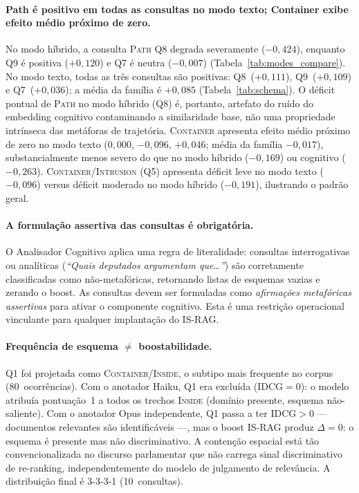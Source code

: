 \documentclass[11pt,a4paper]{article}
\begin{document}
\paragraph{Path é positivo em todas as consultas no modo texto; Container exibe efeito médio próximo de zero.}
No modo híbrido, a consulta \textsc{Path} Q8 degrada severamente
($-0{,}424$), enquanto Q9 é positiva ($+0{,}120$) e Q7 é neutra
($-0{,}007$) (Tabela~\ref{tab:modes_compare}).
No modo texto, todas as três consultas são positivas:
Q8~($+0{,}111$), Q9~($+0{,}109$) e Q7~($+0{,}036$);
a média da família é $+0{,}085$ (Tabela~\ref{tab:schema}).
O déficit pontual de \textsc{Path} no modo híbrido (Q8) é, portanto,
artefato do ruído do embedding cognitivo contaminando a similaridade
base, não uma propriedade intrínseca das metáforas de trajetória.
\textsc{Container} apresenta efeito médio próximo de zero no modo texto
($0{,}000$, $-0{,}096$, $+0{,}046$; média da família $-0{,}017$),
substancialmente menos severo do que no modo híbrido ($-0{,}169$) ou
cognitivo ($-0{,}263$).
\textsc{Container}/\textsc{Intrusion} (Q5) apresenta déficit leve no
modo texto ($-0{,}096$) versus déficit moderado no modo híbrido
($-0{,}191$), ilustrando o padrão geral.

\paragraph{A formulação assertiva das consultas é obrigatória.}
O Analisador Cognitivo aplica uma regra de literalidade: consultas
interrogativas ou analíticas (\emph{``Quais deputados argumentam
que\ldots''}) são corretamente classificadas como não-metafóricas,
retornando listas de esquemas vazias e zerando o boost.
As consultas devem ser formuladas como \emph{afirmações metafóricas
assertivas} para ativar o componente cognitivo.
Esta é uma restrição operacional vinculante para qualquer implantação
do IS-RAG.

\paragraph{Frequência de esquema $\neq$ boostabilidade.}
Q1 foi projetada como \textsc{Container}/\textsc{Inside}, o subtipo
mais frequente no corpus (80~ocorrências).
Com o anotador Haiku, Q1 era excluída (IDCG${=}0$): o modelo atribuía
pontuação~1 a todos os trechos \textsc{Inside} (domínio presente,
esquema não-saliente).
Com o anotador Opus independente, Q1 passa a ter IDCG${>}0$ —
documentos relevantes são identificáveis —, mas o boost IS-RAG
produz $\Delta{=}0$: o esquema é presente mas não discriminativo.
A contenção espacial está tão convencionalizada no discurso parlamentar
que não carrega sinal discriminativo de re-ranking, independentemente
do modelo de julgamento de relevância.
A distribuição final é 3-3-3-1 (10~consultas).
\end{document}

